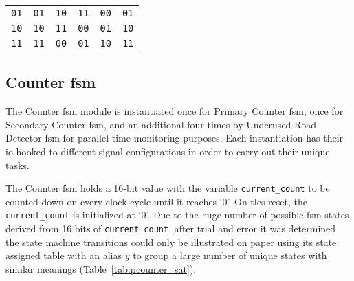 \begin{table}[H]
\begin{NiceTabular}[t]{cccccc}
		\texttt{01}                                                    & \texttt{01}                                                  & \texttt{10}                                                  & \texttt{11}                                                  & \texttt{00}                                                  & \texttt{01}                                       \\
		\texttt{10}                                                    & \texttt{10}                                                  & \texttt{11}                                                  & \texttt{00}                                                  & \texttt{01}                                                  & \texttt{10}                                       \\
		\texttt{11}                                                    & \texttt{11}                                                  & \texttt{00}                                                  & \texttt{01}                                                  & \texttt{10}                                                  & \texttt{11}                                       \\
		\bottomrule
	\end{NiceTabular}
\end{table}
\subsection{Counter \acs{fsm}}
The Counter \ac{fsm} module is instantiated once for Primary Counter \ac{fsm}, once for Secondary Counter \ac{fsm}, and an additional four times by Underused Road Detector \ac{fsm} for parallel time monitoring purposes. Each instantiation has their \ac{io} hooked to different signal configurations in order to carry out their unique tasks.

The Counter \ac{fsm} holds a 16-bit value with the variable \texttt{current\_count} to be counted down on every clock cycle until it reaches `0'. On \ac{tlcs} reset, the \texttt{current\_count} is initialized at `0'. Due to the huge number of possible \ac{fsm} states derived from 16 bits of \texttt{current\_count}, after trial and error it was determined the state machine transitions could only be illustrated on paper using its state assigned table with an alias $y$ to group a large number of unique states with similar meanings (Table~\ref{tab:pcounter_sat}).

